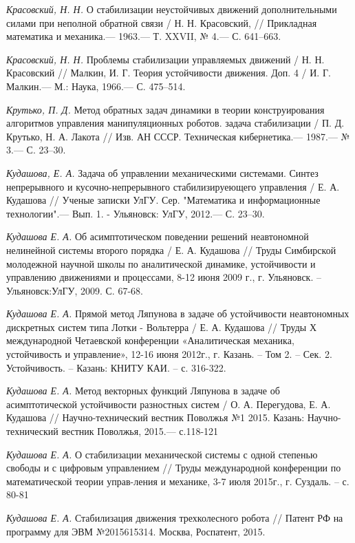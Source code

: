 \begin{thebibliography}{10}
	{\it Красовский, Н. Н.} О стабилизации неустойчивых движений дополнительными силами при неполной обратной связи / Н. Н. Красовский,
	// Прикладная математика и механика.— 1963.— Т. XXVII, № 4.— С. 641–663.
	
	{\it Красовский, Н. Н.} Проблемы стабилизации управляемых движений / Н. Н. Красовский
	// Малкин, И. Г. Теория устойчивости движения. Доп. 4 / И. Г. Малкин.— М.:
	Наука, 1966.— С. 475–514.
	
	{\it Крутько, П. Д.} Метод обратных задач динамики в теории конструирования алгоритмов
	управления манипуляционных роботов. задача стабилизации / П. Д. Крутько, Н. А. Лакота
	// Изв. АН СССР. Техническая кибернетика.— 1987.— № 3.— С. 23–30.
	
	{\it Кудашова, Е. А.} Задача об управлении механическими системами. Синтез непрерывного и кусочно-непрерывного стабилизируеющего управления / Е. А. Кудашова // Ученые записки УлГУ. Сер. "Математика и информационные технологии".— Вып. 1. - Ульяновск: УлГУ, 2012.— С. 23–30.
	
	{\it Кудашова Е. А.} Об асимптотическом поведении решений неавтономной нелинейной системы второго порядка / Е. А. Кудашова //
	Труды Симбирской молодежной научной школы по аналитической динамике, устойчивости и управлению движениями и процессами, 8-12 июня 2009 г., г. Ульяновск. –Ульяновск:УлГУ, 2009. С. 67-68.
	
	{\it Кудашова Е. А.} Прямой метод Ляпунова в задаче об устойчивости неавтономных дискретных систем типа Лотки - Вольтерра / Е. А. Кудашова //
	Труды Х международной Четаевской конференции «Аналитическая механика, устойчивость и управление», 12-16 июня 2012г., г. Казань. – Том 2. – Сек. 2. Устойчивость. – Казань: КНИТУ КАИ. – с. 316-322.
	
	{\it Кудашова Е. А.} Метод векторных функций Ляпунова в задаче об асимптотической устойчивости разностных систем / О. А. Перегудова, Е. А. Кудашова //
	Научно-технический вестник Поволжья №1 2015. Казань: Научно-технический вестник Поволжья, 2015.— с.118-121


{\it Кудашова Е. А.} О стабилизации механической системы с одной степенью свободы и с цифровым управлением // Труды международной конференции по математической теории управ-ления и механике, 3-7 июля 2015г., г. Суздаль. – с. 80-81

{\it Кудашова Е. А.} Стабилизация движения трехколесного робота //  Патент РФ на программу для ЭВМ №2015615314. Москва, Роспатент, 2015. 


\end{thebibliography}
